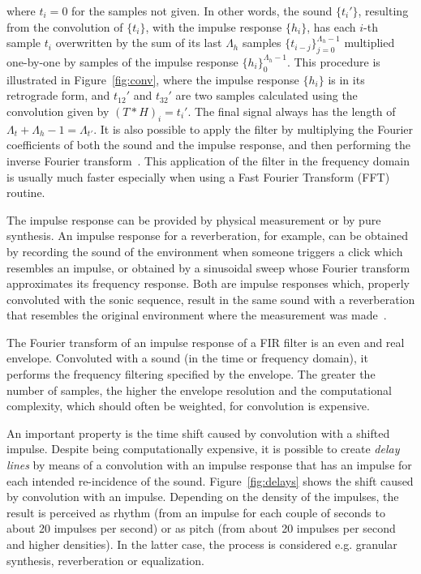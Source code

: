 \noindent where $t_i=0$ for the samples not given.
In other words, the sound $\{t_i'\}$, resulting from the convolution of $\{t_i\}$, with the impulse response $\{h_i\}$, has each $i$-th sample $t_i$ overwritten by the sum of its last $\Lambda_h$ samples $\{t_{i-j}\}_{j=0}^{\Lambda_h-1}$ multiplied one-by-one by samples of the impulse response $\{h_i\}_0^{\Lambda_h-1}$. This procedure is illustrated in Figure~\ref{fig:conv}, where the impulse response $\{h_i\}$ is in its retrograde form, and $t_{12}'$ and $t_{32}'$ are two samples calculated using the convolution given by $(T*H)_i=t_i'$. The final signal always has the length of $\Lambda_t+\Lambda_h -1=\Lambda_{t'}$.
It is also possible to apply the filter by multiplying the Fourier coefficients of both the sound and the impulse response,
and then performing the inverse Fourier transform~\cite{Openheim}.
This application of the filter in the frequency domain is usually much faster
especially when using a Fast Fourier Transform (FFT) routine.

The impulse response can be provided by physical measurement or by pure synthesis.
An impulse response for a reverberation, for example, can be obtained by recording the sound of the environment when someone triggers a click which resembles an impulse, or obtained by a sinusoidal sweep whose Fourier transform approximates its frequency response.
Both are impulse responses which, properly convoluted with the sonic sequence, result in the same sound with a reverberation that resembles the original environment where the measurement was made~\cite{Cook}.

The Fourier transform of an impulse response of a FIR filter is
an even and real envelope.
Convoluted with a sound (in the time or frequency domain), it performs the frequency filtering specified by the envelope.
The greater the number of samples, the higher the envelope resolution and the computational complexity, which should often be weighted, for convolution is expensive.

An important property is the time shift caused by convolution with a shifted impulse. Despite being computationally expensive, it is possible to create \emph{delay lines} by means of a convolution with an impulse response that has an impulse for each intended re-incidence of the sound. Figure~\ref{fig:delays} shows the shift caused by convolution with an impulse. Depending on the density of the impulses, the result is perceived as rhythm (from an impulse for each couple of seconds to about 20 impulses per second) or as pitch (from about 20 impulses per second and higher densities). In the latter case, the process is considered e.g. granular synthesis, reverberation or equalization.

